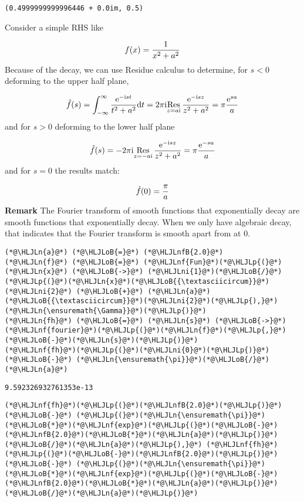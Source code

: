 \documentclass[12pt,a4paper]{article}
\newcommand{\HLJLn}[1]{#1}
\newcommand{\HLJLnf}[1]{\textcolor[RGB]{66,102,213}{#1}}
\newcommand{\HLJLnfB}[1]{\textcolor[RGB]{59,151,46}{#1}}
\newcommand{\HLJLni}[1]{\textcolor[RGB]{59,151,46}{#1}}
\newcommand{\HLJLoB}[1]{\textcolor[RGB]{102,102,102}{\textbf{#1}}}
\newcommand{\HLJLp}[1]{#1}
\def\D{ {\rm d} }
\def\I{ {\rm i} }
\def\E{ {\rm e} }
\def\Res_#1{\underset{#1}{\rm Res}\,}
\def\dt{\D t}
\begin{document}
\begin{lstlisting}
(0.4999999999996446 + 0.0im, 0.5)
\end{lstlisting}


Consider a simple RHS like

\[
f(x) = {1 \over x^2 + a^2}
\]
Because of the decay, we can use Residue calculus to determine, for $s < 0$ deforming to the upper half plane,

\[
\hat f(s) = \int_{-\infty}^\infty {\E^{-\I s t} \over t^2 + a^2}\dt = 2 \pi \I \Res_{z = a \I}{\E^{-\I s z} \over z^2 + a^2} = \pi  {\E^{s a} \over a}
\]
and for $s > 0$ deforming to the lower half plane

\[
\hat f(s) =-2 \pi \I \Res_{z =- a \I}{\E^{-\I s z} \over z^2 + a^2} = \pi {\E^{-s a} \over  a}
\]
and for $s = 0$ the results match:

\[
\hat f(0) = {\pi  \over  a}
\]
\textbf{Remark} The Fourier transform of smooth functions that exponentially decay are smooth functions that exponentially decay. When we only have algebraic decay, that indicates that the Fourier transform is smooth apart from at $0$.


\begin{lstlisting}
(*@\HLJLn{a}@*) (*@\HLJLoB{=}@*) (*@\HLJLnfB{2.0}@*)
(*@\HLJLn{f}@*) (*@\HLJLoB{=}@*) (*@\HLJLnf{Fun}@*)(*@\HLJLp{(}@*)(*@\HLJLn{x}@*) (*@\HLJLoB{->}@*) (*@\HLJLni{1}@*)(*@\HLJLoB{/}@*)(*@\HLJLp{(}@*)(*@\HLJLn{x}@*)(*@\HLJLoB{{\textasciicircum}}@*)(*@\HLJLni{2}@*) (*@\HLJLoB{+}@*) (*@\HLJLn{a}@*)(*@\HLJLoB{{\textasciicircum}}@*)(*@\HLJLni{2}@*)(*@\HLJLp{),}@*) (*@\HLJLn{\ensuremath{\Gamma}}@*)(*@\HLJLp{)}@*)
(*@\HLJLn{fh}@*) (*@\HLJLoB{=}@*) (*@\HLJLn{s}@*) (*@\HLJLoB{->}@*) (*@\HLJLnf{fourier}@*)(*@\HLJLp{(}@*)(*@\HLJLn{f}@*)(*@\HLJLp{,}@*) (*@\HLJLoB{-}@*)(*@\HLJLn{s}@*)(*@\HLJLp{)}@*)
(*@\HLJLnf{fh}@*)(*@\HLJLp{(}@*)(*@\HLJLni{0}@*)(*@\HLJLp{)}@*) (*@\HLJLoB{-}@*) (*@\HLJLn{\ensuremath{\pi}}@*)(*@\HLJLoB{/}@*)(*@\HLJLn{a}@*)
\end{lstlisting}

\begin{lstlisting}
9.592326932761353e-13
\end{lstlisting}


\begin{lstlisting}
(*@\HLJLnf{fh}@*)(*@\HLJLp{(}@*)(*@\HLJLnfB{2.0}@*)(*@\HLJLp{)}@*) (*@\HLJLoB{-}@*) (*@\HLJLp{(}@*)(*@\HLJLn{\ensuremath{\pi}}@*)(*@\HLJLoB{*}@*)(*@\HLJLnf{exp}@*)(*@\HLJLp{(}@*)(*@\HLJLoB{-}@*)(*@\HLJLnfB{2.0}@*)(*@\HLJLoB{*}@*)(*@\HLJLn{a}@*)(*@\HLJLp{)}@*)(*@\HLJLoB{/}@*)(*@\HLJLn{a}@*)(*@\HLJLp{),}@*) (*@\HLJLnf{fh}@*)(*@\HLJLp{(}@*)(*@\HLJLoB{-}@*)(*@\HLJLnfB{2.0}@*)(*@\HLJLp{)}@*) (*@\HLJLoB{-}@*) (*@\HLJLp{(}@*)(*@\HLJLn{\ensuremath{\pi}}@*)(*@\HLJLoB{*}@*)(*@\HLJLnf{exp}@*)(*@\HLJLp{(}@*)(*@\HLJLoB{-}@*)(*@\HLJLnfB{2.0}@*)(*@\HLJLoB{*}@*)(*@\HLJLn{a}@*)(*@\HLJLp{)}@*)(*@\HLJLoB{/}@*)(*@\HLJLn{a}@*)(*@\HLJLp{)}@*)
\end{lstlisting}
\end{document}
